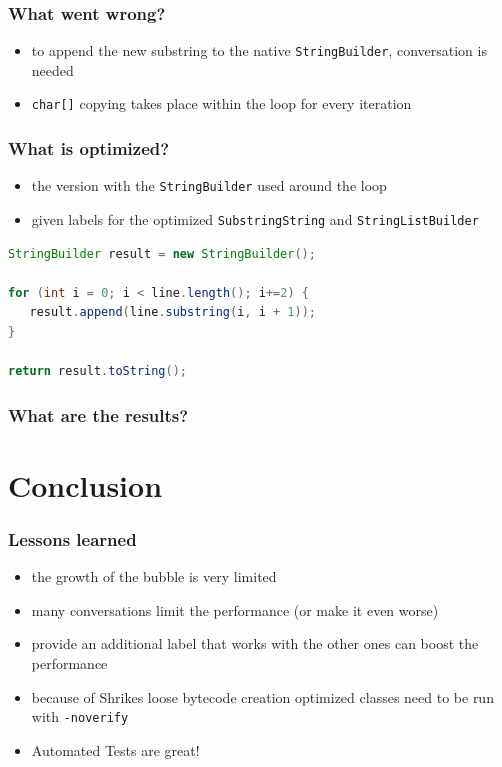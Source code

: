 \documentclass{beamer}
\begin{document}
\begin{frame}
   \frametitle{What went wrong?}
   \begin{itemize}
      \item to append the new substring to the native \texttt{StringBuilder}, conversation is needed
      \item \texttt{char[]} copying takes place within the loop for every iteration
   \end{itemize}
\end{frame}

\begin{frame}[fragile]
   \frametitle{What is optimized?}
   
   \begin{itemize}
      \item the version with the \texttt{StringBuilder} used around the loop
      \item given labels for the optimized \texttt{SubstringString} and \texttt{StringListBuilder}
   \end{itemize}

   \begin{lstlisting}[language=Java]
StringBuilder result = new StringBuilder();

for (int i = 0; i < line.length(); i+=2) {
   result.append(line.substring(i, i + 1));
}

return result.toString();
   \end{lstlisting}   

\end{frame}

\begin{frame}
  \frametitle{What are the results?}
  \begin{bchart}[step=500,max=1500]
      \smallskip
      \smallskip
  \end{bchart}
\end{frame}

\section{Conclusion}

\frame{\sectionpage}

\begin{frame}
	\frametitle{Lessons learned}
   \begin{itemize}
      \item the growth of the bubble is very limited
      \item many conversations limit the performance (or make it even worse)  
      \item provide an additional label that works with the other ones can boost the performance
      \item because of Shrikes loose bytecode creation optimized classes need to be run with \texttt{-noverify}
      \item Automated Tests are great!
   \end{itemize}
\end{frame}
\end{document}
